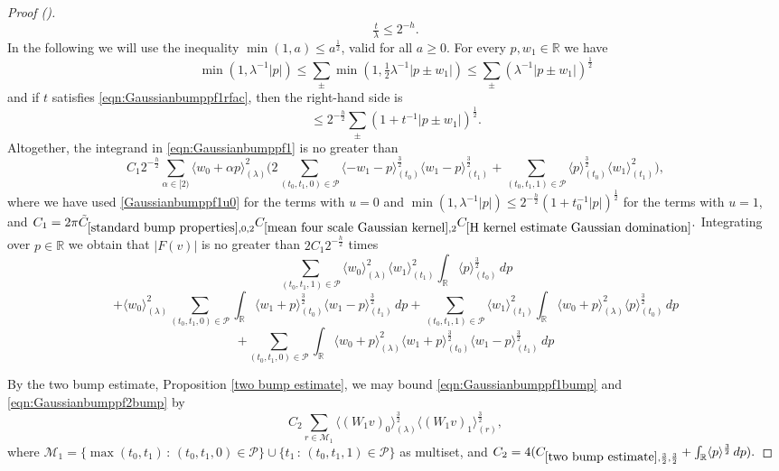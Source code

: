 \documentclass[12pt,reqno]{amsart}
\newcommand{\auto}{{({\tiny\faCar})}}
\theoremstyle{plain}
\numberwithin{equation}{section}
\theoremstyle{remark}
\newcommand{\R}{{\mathbb R}}
\begin{document}
\begin{proof}[Proof \auto]
\begin{equation}
\tfrac{t}{\lambda} \le 2^{-h}.
\end{equation}
In the following we will use the inequality $\min(1,a)\le a^\frac12$, valid for all $a\ge 0$. For every $p,w_1\in\R$ we have
\[ \min(1, \lambda^{-1}|p|) \le \sum_{\pm} \min(1, \tfrac12\lambda^{-1}|p\pm w_1|) \le \sum_{\pm} (\lambda^{-1}|p\pm w_1|)^{\tfrac12}\]
and if $t$ satisfies \eqref{eqn:Gaussianbumppf1rfac}, then the right-hand side is
\begin{equation}\label{Gaussianbumppf1u0}
\le 2^{-\tfrac{h}{2}} \sum_{\pm} (1+ t^{-1} |p\pm w_1|)^{\tfrac12}.
\end{equation}
Altogether, the integrand in \eqref{eqn:Gaussianbumppf1} is no greater than
\[ C_1 2^{-\tfrac{h}{2}} \sum_{\alpha\in[2)} \langle w_0+\alpha p\rangle_{(\lambda)}^2 \Big( 2\sum_{(t_0,t_1,0)\in\mathcal{P}} \langle -w_1-p\rangle_{(t_0)}^{\tfrac32} \langle w_1-p\rangle_{(t_1)}^{\tfrac32} +\sum_{(t_0,t_1,1)\in\mathcal{P}} \langle p\rangle^{\tfrac32}_{(t_0)} \langle w_1\rangle_{(t_1)}^2  \Big),\]
where we have used \eqref{Gaussianbumppf1u0} for the terms with $u=0$ and $\min(1,\lambda^{-1}|p|)\le 2^{-\frac{h}{2}}(1+t_0^{-1}|p|)^{\frac12}$ for the terms with $u=1$, and
$C_1 = 2\pi \tilde{C}_{\ref{standard bump properties},0,2}
C_{\ref{mean four scale Gaussian kernel},2} C_{\ref{H kernel estimate Gaussian domination}}.$
Integrating over $p\in\R$ we obtain that $|F(v)|$ is no greater than $2C_1 2^{-\frac{h}{2}}$ times
\begin{equation}\label{eqn:Gaussianbumppf1bump}
\sum_{(t_0,t_1,1)\in\mathcal{P}}\langle w_0\rangle_{(\lambda)}^2 \langle w_1\rangle^2_{(t_1)} \int_{\R}\langle p\rangle_{(t_0)}^{\tfrac32}\,dp
\end{equation}
\begin{equation}\label{eqn:Gaussianbumppf2bump}
 +\langle w_0\rangle_{(\lambda)}^2 \sum_{(t_0,t_1,0)\in\mathcal{P}} \int_{\R} \langle w_1+p\rangle_{(t_0)}^{\tfrac32} \langle w_1-p\rangle_{(t_1)}^{\tfrac32}\,dp  + \sum_{(t_0,t_1,1)\in\mathcal{P}} \langle w_1\rangle^2_{(t_1)} \int_\R \langle w_0+p\rangle_{(\lambda)}^2 \langle p\rangle_{(t_0)}^{\tfrac32}  \, dp
\end{equation}
\begin{equation}\label{eqn:Gaussianbumppf3bump}
+ \sum_{(t_0,t_1,0)\in\mathcal{P}}\int_{\R} \langle w_0+p\rangle_{(\lambda)}^2 \langle w_1+p\rangle_{(t_0)}^{\tfrac32} \langle w_1-p\rangle_{(t_1)}^{\tfrac32}\,dp
\end{equation}

By the two bump estimate, Proposition \ref{two bump estimate}, we may bound \eqref{eqn:Gaussianbumppf1bump} and \eqref{eqn:Gaussianbumppf2bump} by
\[
C_{2} \sum_{r\in \mathcal{M}_1} \langle (W_1 v)_0\rangle_{(\lambda)}^{\tfrac32}\langle (W_1 v)_1\rangle_{(r)}^{\tfrac32},
\]
where $\mathcal{M}_1=\{\max(t_0,t_1)\,:\,(t_0,t_1,0)\in \mathcal{P}\}\cup \{ t_1 \,:\,(t_0,t_1,1)\in \mathcal{P}\}$ as multiset, and
$C_2 = 4(C_{\ref{two bump estimate},\frac32,\frac32}+ \int_{\R}\langle p\rangle^{\frac32}\,dp).$


\end{proof}
\end{document}

